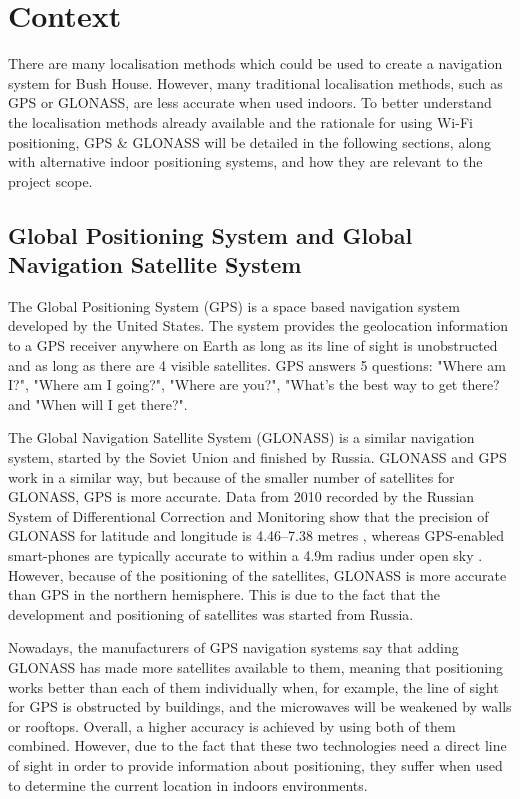 \section{Context}
\label{sec:context}
There are many localisation methods which could be used to create a navigation system for Bush House. However, many traditional localisation methods, such as GPS or GLONASS, are less accurate when used indoors. To better understand the localisation methods already available and the rationale for using Wi-Fi positioning, GPS \& GLONASS will be detailed in the following sections, along with alternative indoor positioning systems, and how they are relevant to the project scope.

\subsection{Global Positioning System and Global Navigation Satellite System}
\label{sec:gps-glonass}

The Global Positioning System (GPS) \cite{gps} is a space based navigation system developed by the United States. The system provides the geolocation information to a GPS receiver anywhere on Earth as long as its line of sight is unobstructed and as long as there are 4 visible satellites. GPS answers 5 questions: "Where am I?", "Where am I going?", "Where are you?", "What's the best way to get there? and "When will I get there?"\cite{gps}.

The Global Navigation Satellite System (GLONASS) is a similar navigation system, started by the Soviet Union and finished by Russia. GLONASS and GPS work in a similar way, but because of the smaller number of satellites for GLONASS, GPS is more accurate. Data from 2010 recorded by the Russian System of Differentional Correction and Monitoring show that the precision of GLONASS for latitude and longitude is 4.46–7.38 metres \cite{russian-monitoring-system}, whereas GPS-enabled smart-phones are typically accurate to within a 4.9m  radius under open sky \cite{gps-gov}. However, because of the positioning of the satellites, GLONASS is more accurate than GPS in the northern hemisphere. This is due to the fact that the development and positioning of satellites was started from Russia.

Nowadays, the manufacturers of GPS navigation systems say that adding GLONASS has made more satellites available to them, meaning that positioning works better than each of them individually when, for example, the line of sight for GPS is obstructed by buildings, and the microwaves will be weakened by walls or rooftops. Overall, a higher accuracy is achieved \cite{glonass-gps-1, glonass-gps-2} by using both of them combined. However, due to the fact that these two technologies need a direct line of sight in order to provide information about positioning, they suffer when used to determine the current location in indoors environments.

